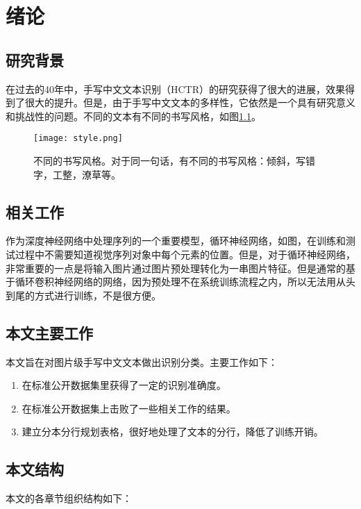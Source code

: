 \documentclass[winfonts]{njuthesis}
\begin{document}
\chapter{绪论}\label{chapter_introduction}
\section{研究背景}
在过去的40年中，手写中文文本识别（HCTR）的研究获得了很大的进展，效果得到了很大的提升\cite{fujisawa2008forty}。但是，由于手写中文文本的多样性，它依然是一个具有研究意义和挑战性的问题\cite{xu2012touching}。不同的文本有不同的书写风格，如图\ref{fig:style}。 

\begin{figure}[htbp]
   \centering
   \texttt{[image: style.png]} %
   \caption{不同的书写风格。对于同一句话，有不同的书写风格：倾斜，写错字，工整，潦草等。}
   \label{fig:style}
\end{figure}

\section{相关工作}

作为深度神经网络中处理序列的一个重要模型，循环神经网络，如图，在训练和测试过程中不需要知道视觉序列对象中每个元素的位置。但是，对于循环神经网络，非常重要的一点是将输入图片通过图片预处理转化为一串图片特征\cite{graves2009novel,su2014accurate}。但是通常的基于循环卷积神经网络的网络，因为预处理不在系统训练流程之内，所以无法用从头到尾的方式进行训练，不是很方便。


\section{本文主要工作}
本文旨在对图片级手写中文文本做出识别分类。主要工作如下：
\begin{enumerate}
\item 在标准公开数据集里获得了一定的识别准确度。

\item 在标准公开数据集上击败了一些相关工作的结果。

\item 建立分本分行规划表格，很好地处理了文本的分行，降低了训练开销。

\end{enumerate}
\section{本文结构}
本文的各章节组织结构如下：
\end{document}
